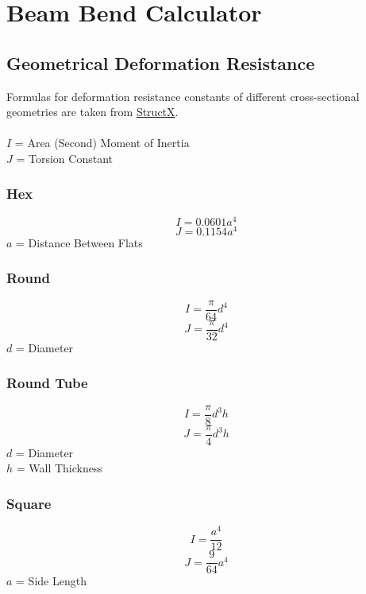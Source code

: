 \documentclass[11pt,a4paper,titlepage]{article}
\begin{document}
	\bigskip
	\section{Beam Bend Calculator}
	\subsection{Geometrical Deformation Resistance}
	Formulas for deformation resistance constants of different cross-sectional geometries are taken from \href{https://structx.com/geometric_properties.html}{StructX}. \\ \\
	$I$ = Area (Second) Moment of Inertia \\
	$J$ = Torsion Constant
	\subsubsection{Hex}
	\begin{equation}
		I = 0.0601 a^4
	\end{equation}
	\begin{equation}
		J = 0.1154 a^4
	\end{equation}
	$a$ = Distance Between Flats
	
	\subsubsection{Round}
	\begin{equation}
		I = \frac{\pi}{64} d^4
	\end{equation}
	\begin{equation}
		J = \frac{\pi}{32} d^4
	\end{equation}
	$d$ = Diameter
	
	\subsubsection{Round Tube}
	\begin{equation}
		I = \frac{\pi}{8} d^3 h
	\end{equation}
	\begin{equation}
		J = \frac{\pi}{4} d^3 h
	\end{equation}
	$d$ = Diameter \\
	$h$ = Wall Thickness
	
	\subsubsection{Square}
	\begin{equation}
		I = \frac{a^4}{12}
	\end{equation}
	\begin{equation}
		J = \frac{9}{64} a^4
	\end{equation}
	$a$ = Side Length
	
\end{document}
